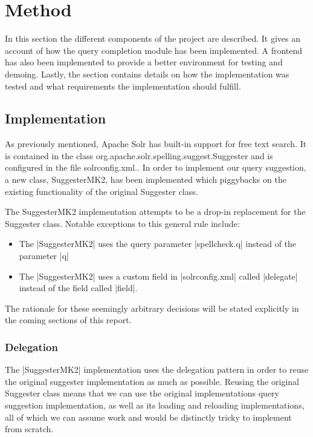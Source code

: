 \section{Method}\label{method}

In this section the different components of the project are described. It gives an account of how the query completion module has been implemented. A frontend has also been implemented to provide a better environment for testing and demoing. Lastly, the section contains details on how the implementation was tested and what requirements the implementation should fulfill. 

\subsection{Implementation}

As previously mentioned, Apache Solr has built-in support for free text search. It is contained in the class org.apache.solr.spelling.suggest.Suggester and is configured in the file solrconfig.xml.. In order to implement our query suggestion, a new class, SuggesterMK2, has been implemented which piggybacks on the existing functionality of the original Suggester class.\cite{SUGGESTER}

The SuggesterMK2 implementation attempts to be a drop-in replacement for the Suggester class. Notable exceptions to this general rule include:
\begin{itemize}

\item The |SuggesterMK2| uses the query parameter |spellcheck.q| instead of the parameter |q|
\item The |SuggesterMK2| uses a custom field in |solrconfig.xml| called |delegate| instead of the field called |field|.
\end{itemize}

The rationale for these seemingly arbitrary decisions will be stated explicitly in the coming sections of this report.

\subsubsection{Delegation}

The |SuggesterMK2| implementation uses the delegation pattern\cite{DELEGATE} in order to reuse the original suggester implementation as much as possible. Reusing the original Suggester class means that we can use the original implementations query suggestion implementation, as well as its loading and reloading implementations, all of which we can assume work and would be distinctly tricky to implement from scratch.

